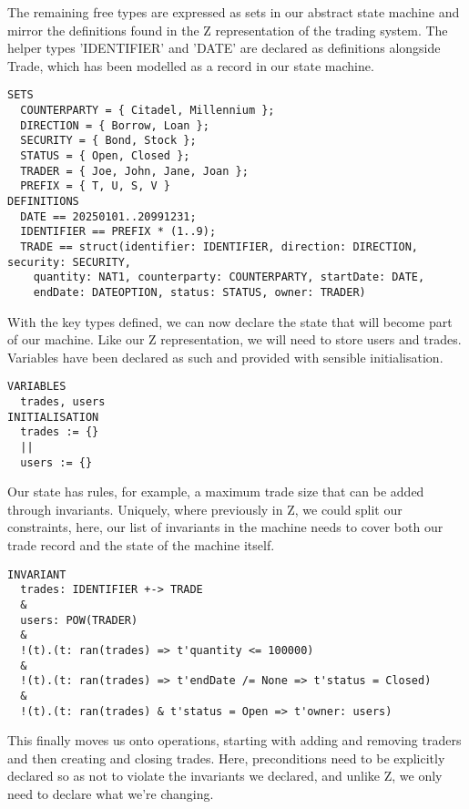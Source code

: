 \documentclass{article}
\begin{document}
\hspace{-0.7cm} The remaining free types are expressed as sets in our abstract state machine and mirror the definitions found in the Z representation of the trading system. The helper types 'IDENTIFIER' and 'DATE' are declared as definitions alongside Trade, which has been modelled as a record in our state machine.
\begin{verbatim}
SETS 
  COUNTERPARTY = { Citadel, Millennium };
  DIRECTION = { Borrow, Loan };
  SECURITY = { Bond, Stock };
  STATUS = { Open, Closed };
  TRADER = { Joe, John, Jane, Joan };
  PREFIX = { T, U, S, V }
DEFINITIONS
  DATE == 20250101..20991231;
  IDENTIFIER == PREFIX * (1..9);
  TRADE == struct(identifier: IDENTIFIER, direction: DIRECTION, security: SECURITY, 
    quantity: NAT1, counterparty: COUNTERPARTY, startDate: DATE, 
    endDate: DATEOPTION, status: STATUS, owner: TRADER)
\end{verbatim}

\hspace{-0.7cm} With the key types defined, we can now declare the state that will become part of our machine. Like our Z representation, we will need to store users and trades. Variables have been declared as such and provided with sensible initialisation.

\begin{verbatim}
VARIABLES
  trades, users
INITIALISATION
  trades := {}
  ||
  users := {}
\end{verbatim}
    
\hspace{-0.7cm} Our state has rules, for example, a maximum trade size that can be added through invariants. Uniquely, where previously in Z, we could split our constraints, here, our list of invariants in the machine needs to cover both our trade record and the state of the machine itself.
\begin{verbatim}
INVARIANT
  trades: IDENTIFIER +-> TRADE
  &
  users: POW(TRADER)    
  &
  !(t).(t: ran(trades) => t'quantity <= 100000)
  &
  !(t).(t: ran(trades) => t'endDate /= None => t'status = Closed)
  &
  !(t).(t: ran(trades) & t'status = Open => t'owner: users)
\end{verbatim}

\hspace{-0.68cm} This finally moves us onto operations, starting with adding and removing traders and then creating and closing trades. Here, preconditions need to be explicitly declared so as not to violate the invariants we declared, and unlike Z, we only need to declare what we’re changing.
\end{document}
